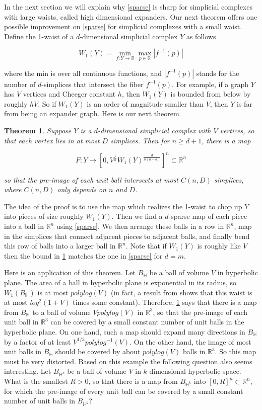 \documentclass[12pt]{article}
\newtheorem{theorem}{Theorem}
\newcommand{\RR}{\mathbb{R}}
\newcommand{\HH}{\mathbb{H}}
\begin{document}
	In the next section we will explain why \cref{sparse} is sharp for simplicial complexes with large waists, called high dimensional expanders. Our next theorem offers one possible improvement on \cref{sparse} for simplicial complexes with a small waist. Define the 1-waist of a $d$-dimensional simplicial complex $Y$ as follows
	
	$$W_1(Y) =  \min_{f:Y \to \RR} \max_{p \in \RR} |f^{-1}(p)|$$
	
	\noindent where the min is over all continuous functions, and $|f^{-1}(p)|$ stands for the number of $d$-simplices that intersect the fiber $f^{-1}(p)$. For example, if a graph $Y$ has $V$ vertices and Cheeger constant $h$, then $W_1(Y)$ is bounded from below by roughly $hV$. So if $W_1(Y)$ is an order of magnitude smaller than $V$, then $Y$ is far from being an expander graph. Here is our next theorem.
	
	\begin{theorem}\label{smallwaist} Suppose $Y$ is a $d$-dimensional simplicial complex with $V$ vertices, so that each vertex lies in at most $D$ simplices. Then for $n \ge d+1$, there is a map
		
		$$F: Y \to [0,V^{\frac{1}{n}} W_1(Y)^{\frac{d}{n(n-d)}}]^n \subset \mathbb{R}^n$$
		
		\noindent so that the pre-image of each unit ball intersects at most $C(n, D)$ simplices, where $C(n,D)$ only depends on $n$ and $D$.
	\end{theorem} 
	
	\noindent The idea of the proof is to use the map which realizes the 1-waist to chop up $Y$ into pieces of size roughly $W_1(Y)$. Then we find a $d$-sparse map of each piece into a ball in $\RR^n$ using \cref{sparse}. We then arrange these balls in a row in $\RR^n$, map in the simplices that connect adjacent pieces to adjacent balls, and finally bend this row of balls into a larger ball in $\RR^n$. Note that if $W_1(Y)$ is roughly like $V$ then the bound in \cref{smallwaist} matches the one in \cref{sparse} for $d=m$.
	
	Here is an application of this theorem. Let $B_{\HH}$ be a ball of volume $V$ in hyperbolic plane. The area of a ball in hyperbolic plane is exponential in its radius, so $W_1(B_{\HH})$ is at most $polylog(V)$ (in fact, a result from \cite{H} shows that this waist is at most $log^2(1+V)$ times some constant). Therefore, \cref{smallwaist} says that there is a map from $B_{\HH}$ to a ball of volume $V polylog(V)$ in $\RR^{3}$, so that the pre-image of each unit ball in $\RR^{3}$ can be covered by a small constant number of unit balls in the hyperbolic plane. On one hand, such a map should expand many directions in $B_{\HH}$ by a factor of at least $V^{1/3} polylog^{-1}(V)$. On the other hand, the image of most unit balls in $B_{\HH}$ should be covered by about $polylog(V)$ balls in $\RR^3$. So this map must be very distorted. Based on this example the following question also seems interesting. Let  $B_{\HH^k}$ be a ball of volume $V$ in $k$-dimensional hyperbolic space. What is the smallest $R>0$, so that there is a map from $B_{\HH^k}$ into $[0,R]^n \subset \RR^n$, for which the pre-image of every unit ball can be covered by a small constant number of unit balls in $B_{\HH^k}$?
	
\end{document}
